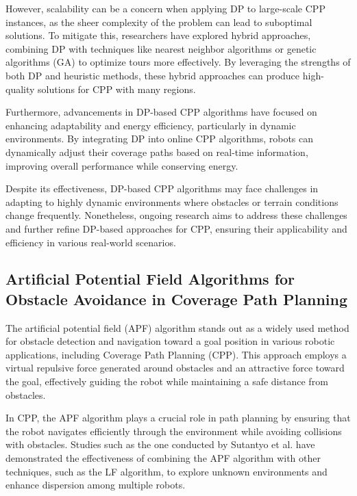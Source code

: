 \vspace*{6mm}

However, scalability can be a concern when applying DP to large-scale CPP instances, as the sheer complexity of the problem can lead to suboptimal solutions. To mitigate this, researchers have explored hybrid approaches, combining DP with techniques like nearest neighbor algorithms or genetic algorithms (GA) to optimize tours more effectively. By leveraging the strengths of both DP and heuristic methods, these hybrid approaches can produce high-quality solutions for CPP with many regions.

\vspace*{6mm}

Furthermore, advancements in DP-based CPP algorithms have focused on enhancing adaptability and energy efficiency, particularly in dynamic environments. By integrating DP into online CPP algorithms, robots can dynamically adjust their coverage paths based on real-time information, improving overall performance while conserving energy.

\vspace*{6mm}

Despite its effectiveness, DP-based CPP algorithms may face challenges in adapting to highly dynamic environments where obstacles or terrain conditions change frequently. Nonetheless, ongoing research aims to address these challenges and further refine DP-based approaches for CPP, ensuring their applicability and efficiency in various real-world scenarios.

\subsection{Artificial Potential Field Algorithms for Obstacle Avoidance in Coverage Path Planning}

The artificial potential field (APF) algorithm stands out as a widely used method for obstacle detection and navigation toward a goal position in various robotic applications, including Coverage Path Planning (CPP). This approach employs a virtual repulsive force generated around obstacles and an attractive force toward the goal, effectively guiding the robot while maintaining a safe distance from obstacles.

\vspace*{6mm}

In CPP, the APF algorithm plays a crucial role in path planning by ensuring that the robot navigates efficiently through the environment while avoiding collisions with obstacles. Studies such as the one conducted by Sutantyo et al. have demonstrated the effectiveness of combining the APF algorithm with other techniques, such as the LF algorithm, to explore unknown environments and enhance dispersion among multiple robots.

